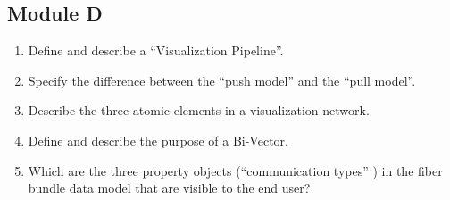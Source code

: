 \documentclass[10pt]{article}
\begin{document}
\subsection{Module D} %
 \begin{enumerate}
  \item Define and describe a ``Visualization Pipeline''.
  \item Specify the difference between the ``push model'' and the ``pull model''.
  \item Describe the three atomic elements in a visualization network.
  \item Define and describe the purpose of a Bi-Vector.
  \item Which are the three property objects (``communication types'' ) in the fiber bundle data model that are visible to the end user?
 \end{enumerate}
\end{document}
